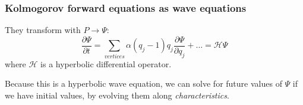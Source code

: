 \documentclass{beamer}
\begin{document}
\begin{frame}
    \frametitle{Kolmogorov forward equations as wave equations}
    They transform with $P \rightarrow \Psi$:
    \begin{equation}
        \frac{\partial \Psi}{\partial t} = \sum_{vertices} \alpha (q_j - 1) q_j
        \frac{\partial \Psi}{\partial q_j} + \dots = \mathcal{H}\Psi
    \end{equation}
    where $\mathcal{H}$ is a hyperbolic differential operator.

    Because this is a hyperbolic wave equation, we can solve for future values
    of $\Psi$ if we have initial values, by evolving them along
    \emph{characteristics}.

\end{frame}
\end{document}
